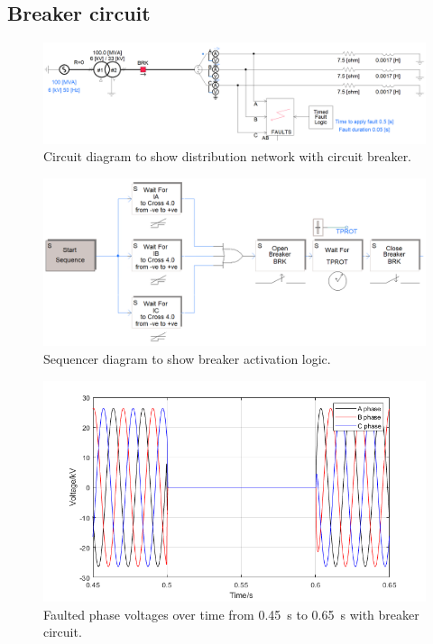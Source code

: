 \subsection{Breaker circuit}
\begin{figure}[H]
    \centering
    \includegraphics[width = \textwidth]{img/figure15.png}
    \caption{Circuit diagram to show distribution network with circuit breaker.}
    \label{fig:breakerNetwork}
\end{figure}
\begin{figure}[H]
    \centering
    \includegraphics[width = \textwidth]{img/figure16.png}
    \caption{Sequencer diagram to show breaker activation logic.}
    \label{fig:sequencer}
\end{figure}
\begin{figure}[H]
    \centering
    \includegraphics[width = \textwidth]{img/figure17.png}
    \caption{Faulted phase voltages over time from \SI{0.45}{\second} to \SI{0.65}{\second} with breaker circuit.}
    \label{fig:fault1BRK}
\end{figure}
